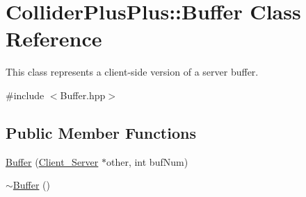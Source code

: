 \hypertarget{classColliderPlusPlus_1_1Buffer}{\section{Collider\-Plus\-Plus\-:\-:Buffer Class Reference}
\label{classColliderPlusPlus_1_1Buffer}
}


This class represents a client-\/side version of a server buffer.  




{\ttfamily \#include $<$Buffer.\-hpp$>$}

\subsection*{Public Member Functions}
\begin{DoxyCompactItemize}
\item 
\hyperlink{classColliderPlusPlus_1_1Buffer_af5728dbdffa6dd43efe7cc2e520462b2}{Buffer} (\hyperlink{classColliderPlusPlus_1_1Client__Server}{Client\-\_\-\-Server} $\ast$other, int buf\-Num)
\item 
\hypertarget{classColliderPlusPlus_1_1Buffer_a62178f1cb35c5654c0b16d78526de7e8}{\hyperlink{classColliderPlusPlus_1_1Buffer_a62178f1cb35c5654c0b16d78526de7e8}{$\sim$\-Buffer} ()}\label{classColliderPlusPlus_1_1Buffer_a62178f1cb35c5654c0b16d78526de7e8}


\end{DoxyCompactItemize}
